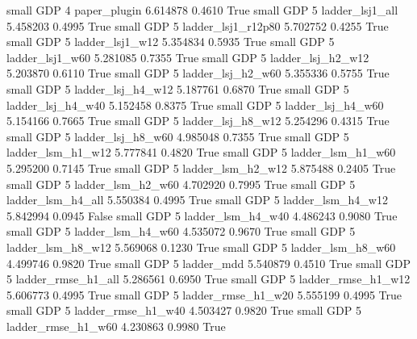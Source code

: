      small      GDP                 4             paper_plugin   6.614878      0.4610    True
     small      GDP                 5          ladder_lsj1_all   5.458203      0.4995    True
     small      GDP                 5       ladder_lsj1_r12p80   5.702752      0.4255    True
     small      GDP                 5          ladder_lsj1_w12   5.354834      0.5935    True
     small      GDP                 5          ladder_lsj1_w60   5.281085      0.7355    True
     small      GDP                 5        ladder_lsj_h2_w12   5.203870      0.6110    True
     small      GDP                 5        ladder_lsj_h2_w60   5.355336      0.5755    True
     small      GDP                 5        ladder_lsj_h4_w12   5.187761      0.6870    True
     small      GDP                 5        ladder_lsj_h4_w40   5.152458      0.8375    True
     small      GDP                 5        ladder_lsj_h4_w60   5.154166      0.7665    True
     small      GDP                 5        ladder_lsj_h8_w12   5.254296      0.4315    True
     small      GDP                 5        ladder_lsj_h8_w60   4.985048      0.7355    True
     small      GDP                 5        ladder_lsm_h1_w12   5.777841      0.4820    True
     small      GDP                 5        ladder_lsm_h1_w60   5.295200      0.7145    True
     small      GDP                 5        ladder_lsm_h2_w12   5.875488      0.2405    True
     small      GDP                 5        ladder_lsm_h2_w60   4.702920      0.7995    True
     small      GDP                 5        ladder_lsm_h4_all   5.550384      0.4995    True
     small      GDP                 5        ladder_lsm_h4_w12   5.842994      0.0945   False
     small      GDP                 5        ladder_lsm_h4_w40   4.486243      0.9080    True
     small      GDP                 5        ladder_lsm_h4_w60   4.535072      0.9670    True
     small      GDP                 5        ladder_lsm_h8_w12   5.569068      0.1230    True
     small      GDP                 5        ladder_lsm_h8_w60   4.499746      0.9820    True
     small      GDP                 5               ladder_mdd   5.540879      0.4510    True
     small      GDP                 5       ladder_rmse_h1_all   5.286561      0.6950    True
     small      GDP                 5       ladder_rmse_h1_w12   5.606773      0.4995    True
     small      GDP                 5       ladder_rmse_h1_w20   5.555199      0.4995    True
     small      GDP                 5       ladder_rmse_h1_w40   4.503427      0.9820    True
     small      GDP                 5       ladder_rmse_h1_w60   4.230863      0.9980    True
